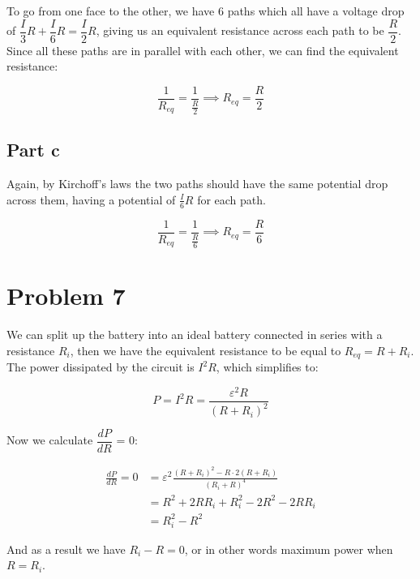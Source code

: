 \documentclass{article}
\theoremstyle{definition}
\numberwithin{equation}{section}
\numberwithin{definition}{section}
\begin{document}
To go from one face to the other, we have 6 paths which all have a voltage drop of $\dfrac{I}{3}R + \dfrac{I}{6}R = \dfrac{I}{2}R$, giving us an equivalent resistance across each path to be $\dfrac{R}{2}$. Since all these paths are in parallel with each other, we can find the equivalent resistance:

\[ \frac{1}{R_{eq}} = \frac{1}{\frac{R}{2}} \implies R_{eq} = \frac{R}{2}\]

\subsection {Part c}


Again, by Kirchoff's laws the two paths should have the same potential drop across them, having a potential of $\frac{I}{6}R$ for each path. 

\[ \frac{1}{R_{eq}} = \frac{1}{\frac{R}{6}} \implies R_{eq} = \frac{R}{6}\]


\section{Problem 7}

We can split up the battery into an ideal battery connected in series with a resistance $R_i$, then we have the equivalent resistance to be equal to $R_{eq} = R + R_i$. The power dissipated by the circuit is $I^2R$, which simplifies to:

\[ P = I^2 R = \frac{\varepsilon^2 R}{(R + R_i)^2}\]

Now we calculate $\dfrac{dP}{dR}$ = 0:

\begin{align*}
    \frac{dP}{dR} = 0 &= \varepsilon^2 \frac{(R + R_i)^2 - R \cdot 2(R + R_i)}{(R_i + R)^4}\\
    &= R^2 + 2RR_i + R_i^2 - 2R^2 - 2RR_i\\
    &= R_i^2 - R^2
\end{align*}

And as a result we have $R_i - R = 0$, or in other words maximum power when $R = R_i$. 
\end{document}
